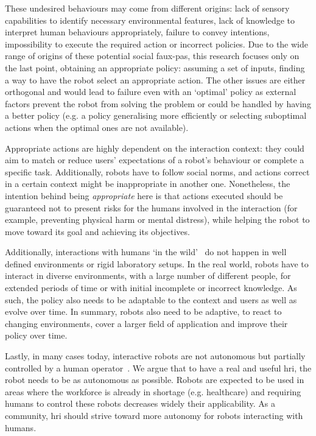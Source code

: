 These undesired behaviours may come from different origins: lack of sensory capabilities to identify necessary environmental features, lack of knowledge to interpret human behaviours appropriately, failure to convey intentions, impossibility to execute the required action or incorrect policies. Due to the wide range of origins of these potential social faux-pas, this research focuses only on the last point, obtaining an appropriate policy: assuming a set of inputs, finding a way to have the robot select an appropriate action. The other issues are either orthogonal and would lead to failure even with an `optimal' policy as external factors prevent the robot from solving the problem or could be handled by having a better policy (e.g. a policy generalising more efficiently or selecting suboptimal actions when the optimal ones are not available).

Appropriate actions are highly dependent on the interaction context: they could aim to match or reduce users' expectations of a robot's behaviour or complete a specific task. Additionally, robots have to follow social norms, and actions correct in a certain context might be inappropriate in another one. Nonetheless, the intention behind being \textit{appropriate} here is that actions executed should be guaranteed not to present risks for the humans involved in the interaction (for example, preventing physical harm or mental distress), while helping the robot to move toward its goal and achieving its objectives.

Additionally, interactions with humans `in the wild'~\citep{belpaeme2012multimodal} do not happen in well defined environments or rigid laboratory setups. In the real world, robots have to interact in diverse environments, with a large number of different people, for extended periods of time or with initial incomplete or incorrect knowledge. As such, the policy also needs to be adaptable to the context and users as well as evolve over time. In summary, robots also need to be adaptive, to react to changing environments, cover a larger field of application and improve their policy over time.

Lastly, in many cases today, interactive robots are not autonomous but partially controlled by a human operator~\citep{riek2012wizard,baxter2016characterising}. We argue that to have a real and useful \gls{hri}, the robot needs to be as autonomous as possible. 
Robots are expected to be used in areas where the workforce is already in shortage (e.g. healthcare) and requiring humans to control these robots decreases widely their applicability. As a community, \gls{hri} should strive toward more autonomy for robots interacting with humans.

